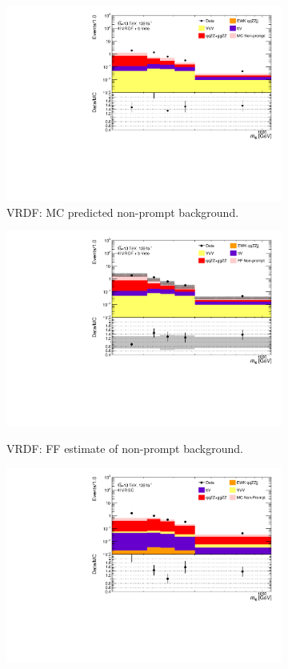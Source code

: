 \begin{figure}[!htb]
    \centering
    \begin{subfigure}{.48\textwidth}
        \centering
        \includegraphics[width = 0.85\linewidth]{figures/Analysis/Background/Overlay_VRDF_RedMC_M4l.pdf}
        \caption{VRDF: MC predicted non-prompt background.\label{subfig:VRDFMCRed}}
    \end{subfigure}
    \begin{subfigure}{.48\textwidth}
        \centering
        \includegraphics[width = 0.85\linewidth]{figures/Analysis/Background/Overlay_VRDF_FFApplied_M4l.pdf}\\
        \caption{ VRDF: FF estimate of non-prompt background. \label{subfig:VRDFFF} }
    \end{subfigure}
    \begin{subfigure}{.48\textwidth}
        \centering
        \includegraphics[width = 0.85\linewidth]{figures/Analysis/Background/Overlay_VRSC_RedMC_M4l.pdf}

\end{subfigure}
\end{figure}
